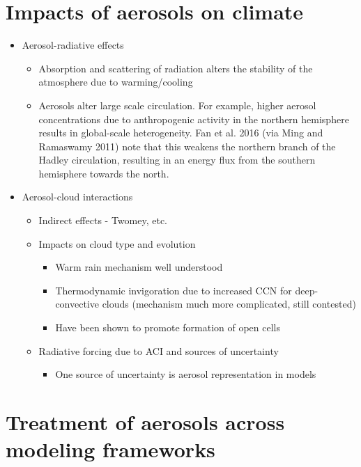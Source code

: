 \section{Impacts of aerosols on climate}

\begin{itemize}

\item Aerosol-radiative effects
\begin{itemize}
\item Absorption and scattering of radiation alters the stability of the atmosphere due to warming/cooling
\item Aerosols alter large scale circulation. For example, higher aerosol concentrations due to anthropogenic activity in the northern hemisphere results in global-scale heterogeneity. Fan et al. 2016 (via Ming and Ramaswamy 2011) note that this weakens the northern branch of the Hadley circulation, resulting in an energy flux from the southern hemisphere towards the north.  
\end{itemize}

\item Aerosol-cloud interactions
\begin{itemize}
\item Indirect effects - Twomey, etc.
\item Impacts on cloud type and evolution
\begin{itemize}
\item Warm rain mechanism well understood
\item Thermodynamic invigoration due to increased CCN for deep-convective clouds (mechanism much more complicated, still contested)
\item Have been shown to promote formation of open cells
\end{itemize}
\item Radiative forcing due to ACI and sources of uncertainty
\begin{itemize}
\item One source of uncertainty is aerosol representation in models
\end{itemize}
\end{itemize}

\end{itemize}

\section{Treatment of aerosols across modeling frameworks}

